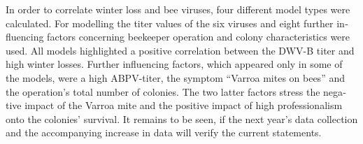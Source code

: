 \begin{otherlanguage}{english}
\newline
In order to correlate winter loss and bee viruses, four different model types were calculated. For modelling the titer values of the six viruses and eight further influencing factors concerning beekeeper operation and colony characteristics were used. All models highlighted a positive correlation between the DWV-B titer and high winter losses. Further influencing factors, which appeared only in some of the models, were a high ABPV-titer, the symptom \enquote{Varroa mites on bees} and the operation's total number of colonies. The two latter factors stress the negative impact of the Varroa mite and the positive impact of high professionalism onto the colonies' survival. It remains to be seen, if the next year's data collection and the accompanying increase in data will verify the current statements.


\end{otherlanguage}
